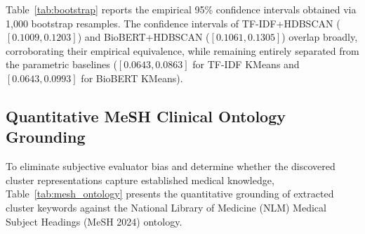 \documentclass[a4paper,10pt,conference]{IEEEtran}
\begin{document}
\begin{table}[t]
\centering
\caption{Bootstrap 95\% confidence intervals (1,000 iterations) for mean NPMI topic coherence across all pipeline configurations.}
\label{tab:bootstrap}
\end{table}

Table~\ref{tab:bootstrap} reports the empirical 95\% confidence intervals obtained via 1,000 bootstrap resamples. The confidence intervals of TF-IDF+HDBSCAN ($[0.1009, 0.1203]$) and BioBERT+HDBSCAN ($[0.1061, 0.1305]$) overlap broadly, corroborating their empirical equivalence, while remaining entirely separated from the parametric baselines ($[0.0643, 0.0863]$ for TF-IDF KMeans and $[0.0643, 0.0993]$ for BioBERT KMeans).

\subsection{Quantitative MeSH Clinical Ontology Grounding}

To eliminate subjective evaluator bias and determine whether the discovered cluster representations capture established medical knowledge, Table~\ref{tab:mesh_ontology} presents the quantitative grounding of extracted cluster keywords against the National Library of Medicine (NLM) Medical Subject Headings (MeSH 2024) ontology.
\end{document}
